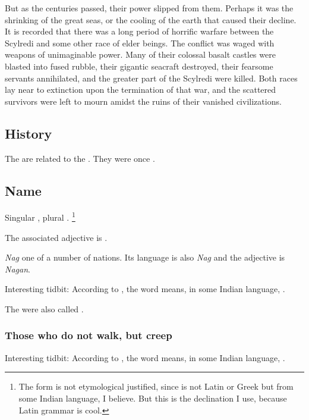 {{    But as the centuries passed, their power slipped from them. Perhaps it was the shrinking of the great
    seas, or the cooling of the earth that caused their decline. It is recorded that there was a long period of
    horrific warfare between the Scylredi and some other race of elder beings. The conflict was waged with
    weapons of unimaginable power. Many of their colossal basalt castles were blasted into fused rubble,
    their gigantic seacraft destroyed, their fearsome servants annihilated, and the greater part of the Scylredi
    were killed. Both races lay near to extinction upon the termination of that war, and the scattered survivors
    were left to mourn amidst the ruins of their vanished civilizations.}
}








\subsection{History}
The \nagae{} are related to the . 
They were once . 








\subsection{Name}
Singular \emph{\naga{}}, plural \emph{\nagae{}}.%
\footnote{%
  The form \quo{\nagae} is not etymological justified, since \quo{\naga} is not Latin or Greek but from some Indian language, I believe. But this is the declination I use, because Latin grammar is cool.} 

The associated adjective is \emph{\naga{}}. 

\emph{Nag} one of a number of \naga{} nations. 
Its language is also \emph{Nag} and the adjective is \emph{Nagan}. 

Interesting tidbit: 
According to \DIBiggestSecret, the word  means, in some Indian language, . 

The \nagae were also called \quo{\ichthyans}. 





\subsubsection{Those who do not walk, but creep}
Interesting tidbit: 
According to \DIBiggestSecret, the word  means, in some Indian language, . 









